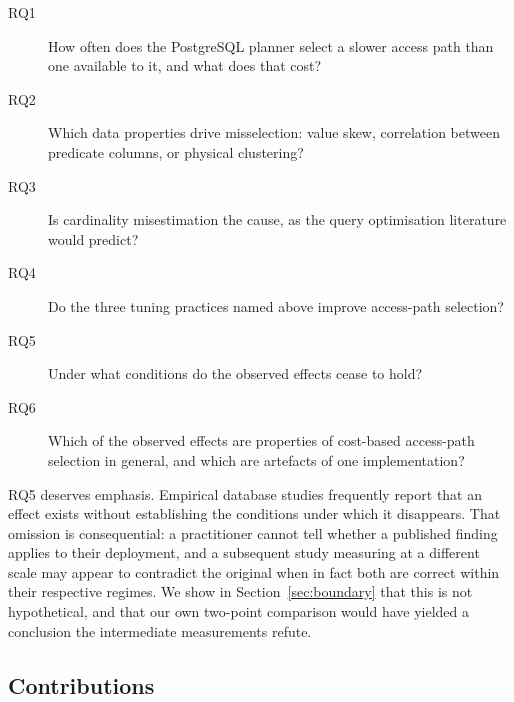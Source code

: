 \documentclass[preprint,12pt,authoryear]{elsarticle}
\begin{document}
\begin{description}
\item[RQ1] How often does the PostgreSQL planner select a slower access
  path than one available to it, and what does that cost?
\item[RQ2] Which data properties drive misselection: value skew,
  correlation between predicate columns, or physical clustering?
\item[RQ3] Is cardinality misestimation the cause, as the query
  optimisation literature would predict?
\item[RQ4] Do the three tuning practices named above improve
  access-path selection?
\item[RQ5] Under what conditions do the observed effects cease to hold?
\item[RQ6] Which of the observed effects are properties of cost-based
  access-path selection in general, and which are artefacts of one
  implementation?
\end{description}

RQ5 deserves emphasis. Empirical database studies frequently report
that an effect exists without establishing the conditions under which
it disappears. That omission is consequential: a practitioner cannot
tell whether a published finding applies to their deployment, and a
subsequent study measuring at a different scale may appear to
contradict the original when in fact both are correct within their
respective regimes. We show in Section~\ref{sec:boundary} that this is
not hypothetical, and that our own two-point comparison would have
yielded a conclusion the intermediate measurements refute.

\subsection{Contributions}
\end{document}
